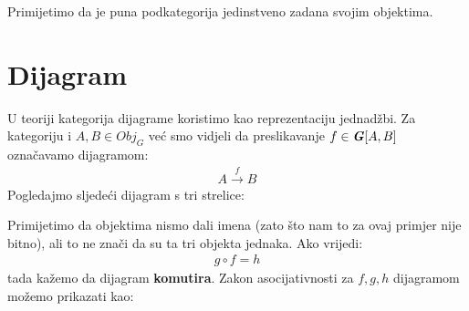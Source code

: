 \noindent Primijetimo da je puna podkategorija jedinstveno zadana svojim objektima.
  \newpage
  \section{Dijagram}
  U teoriji kategorija dijagrame koristimo kao reprezentaciju jednadžbi.
  Za kategoriju  i $A, B \in Obj_G$ već smo vidjeli da
  preslikavanje $f \in \textbf{\emph{G}}[A, B]$ označavamo dijagramom:
  \begin{align*}
    A \xrightarrow{f} B
  \end{align*}
  Pogledajmo sljedeći dijagram s tri strelice:
  \begin{center}
  \end{center}
  Primijetimo da objektima nismo dali imena (zato što nam to za ovaj primjer nije
  bitno), ali to ne znači da su ta tri objekta jednaka. Ako vrijedi:
  \begin{align*}
    g \circ f = h
  \end{align*}
  tada kažemo da dijagram \textbf{komutira}.
  Zakon asocijativnosti za $f, g, h$ dijagramom možemo prikazati kao:
  \begin{center}
  \end{center}


